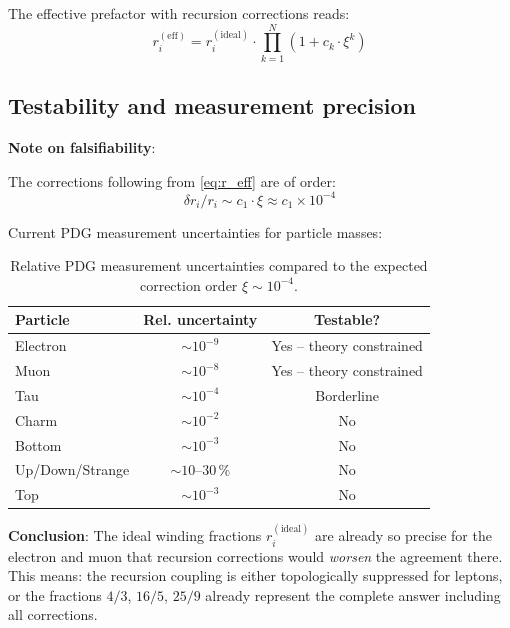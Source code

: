 The effective prefactor with recursion corrections reads:
\begin{equation}
    r_i^{(\mathrm{eff})} = r_i^{(\mathrm{ideal})}
    \cdot \prod_{k=1}^{N} \left(1 + c_k \cdot \xi^k\right)
    \label{eq:r_eff}
\end{equation}

\subsection{Testability and measurement precision}

\textbf{Note on falsifiability}:

The corrections following from \eqref{eq:r_eff} are of order:
\begin{equation}
    \delta r_i / r_i \sim c_1 \cdot \xi \approx c_1 \times 10^{-4}
\end{equation}

Current PDG measurement uncertainties for particle masses:

\begin{table}[htbp]
\centering
\begin{tabular}{lcc}
\toprule
\textbf{Particle} & \textbf{Rel. uncertainty} & \textbf{Testable?} \\
\midrule
Electron & $\sim 10^{-9}$ & Yes -- theory constrained \\
Muon     & $\sim 10^{-8}$ & Yes -- theory constrained \\
Tau      & $\sim 10^{-4}$ & Borderline \\
Charm    & $\sim 10^{-2}$ & No \\
Bottom   & $\sim 10^{-3}$ & No \\
Up/Down/Strange & $\sim 10\text{--}30\,\%$ & No \\
Top      & $\sim 10^{-3}$ & No \\
\bottomrule
\end{tabular}
\caption{Relative PDG measurement uncertainties compared to the expected
correction order $\xi \sim 10^{-4}$.}
\label{tab:precision}
\end{table}

\textbf{Conclusion}: The ideal winding fractions $r_i^{(\mathrm{ideal})}$
are already so precise for the electron and muon that recursion corrections
would \emph{worsen} the agreement there. This means: the recursion coupling
is either topologically suppressed for leptons, or the fractions $4/3$,
$16/5$, $25/9$ already represent the complete answer including all corrections.

